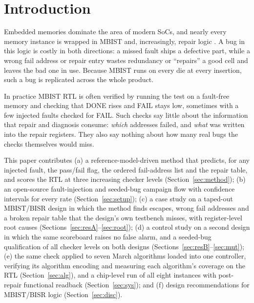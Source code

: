 \documentclass[conference]{IEEEtran}
\begin{document}
\section{Introduction}
Embedded memories dominate the area of modern SoCs, and nearly every memory instance is wrapped
in MBIST and, increasingly, repair logic \cite{zorian2003}. A bug in this logic is costly in both
directions: a missed fault ships a defective part, while a wrong fail address or repair entry
wastes redundancy or ``repairs'' a good cell and leaves the bad one in use. Because MBIST runs
on every die at every insertion, such a bug is replicated across the whole product.

In practice MBIST RTL is often verified by running the test on a fault-free memory and checking
that DONE rises and FAIL stays low, sometimes with a few injected faults checked for FAIL. Such
checks say little about the information that repair and diagnosis consume: \emph{which}
addresses failed, and \emph{what} was written into the repair registers. They also say nothing
about how many real bugs the checks themselves would miss.

This paper contributes (a) a reference-model-driven method that predicts, for any injected fault,
the pass/fail flag, the ordered fail-address list and the repair table, and scores the RTL at
three increasing checker levels (Section~\ref{sec:method}); (b) an open-source fault-injection and
seeded-bug campaign flow with confidence intervals for every rate (Section~\ref{sec:setup}); (c) a
case study on a taped-out MBIST/BISR design in which the method finds escapes, wrong fail
addresses and a broken repair table that the design's own testbench misses, with register-level
root causes (Sections~\ref{sec:resA}--\ref{sec:root}); (d) a control study on a second design in
which the same scoreboard raises no false alarm, and a seeded-bug qualification of all checker
levels on both designs (Sections~\ref{sec:resB}--\ref{sec:mut}); (e) the same check applied to
seven March algorithms loaded into one controller, verifying its algorithm encoding and measuring
each algorithm's coverage on the RTL (Section~\ref{sec:alg}), and a chip-level run of all eight
instances with post-repair functional readback (Section~\ref{sec:sys}); and (f) design recommendations
for MBIST/BISR logic (Section~\ref{sec:disc}).
\end{document}

